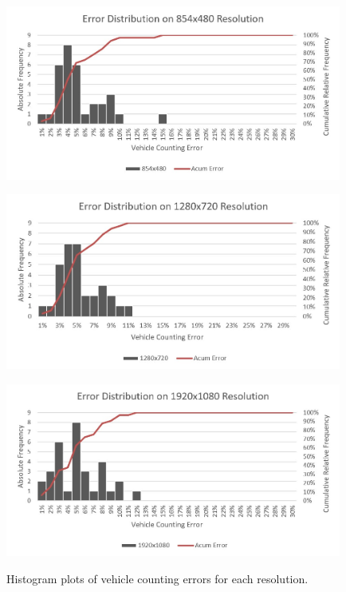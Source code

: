 \documentclass[article,12pt,a4paper,oneside,hidelinks]{memoir}
\begin{document}
\begin{figure}[!htbp]
\begin{minipage}[t]{0.5\textwidth}
		\label{fig:sub:subfigure5ac}
	\end{minipage}
	\hspace{\fill}
	\begin{minipage}[t]{0.5\textwidth}
		\centering
		\includegraphics[width=0.985\textwidth]{Figuras/graf4.jpg}
		\label{fig:sub:subfigure5ad}
	\end{minipage}
	\begin{minipage}[t]{0.5\textwidth}		
		\centering
		\includegraphics[width=0.985\textwidth]{Figuras/graf5.jpg}
		\label{fig:sub:subfigure5ae}
		\vspace{0.025\textwidth}
	\end{minipage}
	\hspace{\fill}
	\begin{minipage}[t]{0.5\textwidth}
		\centering
		\includegraphics[width=0.985\textwidth]{Figuras/graf6.jpg}
		\label{fig:sub:subfigure5af}
		\vspace{0.025\textwidth}
	\end{minipage}
	\caption{Histogram plots of vehicle counting errors for each resolution.}
	\label{fig:fig5a}
\end{figure}
\end{document}
